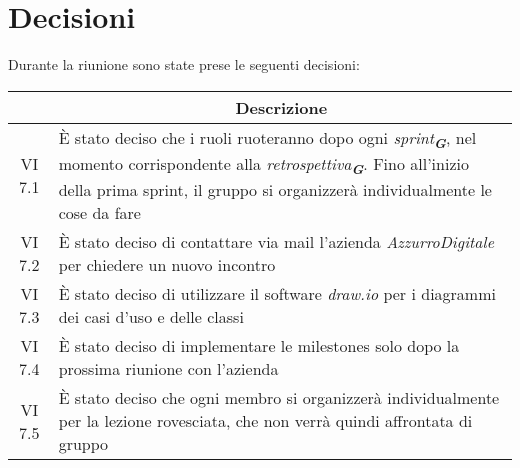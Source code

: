 

\section{Decisioni}

Durante la riunione sono state prese le seguenti decisioni:

\vspace{0.5cm}

\begin{table}[htbp]
    \centering
    \begin{tabular}{|c|p{}|}
        \hline
        \rowcolor[gray]{0.75}
        \multicolumn{1}{|c|}{\textbf{Codice}} & \multicolumn{1}{|c|}{\textbf{Descrizione}}\\
        \hline
        VI 7.1 & È stato deciso che i ruoli ruoteranno dopo ogni \emph{sprint}\textsubscript{\textit{\textbf{G}}}, nel momento corrispondente alla 
        \emph{retrospettiva}\textsubscript{\textit{\textbf{G}}}. Fino all'inizio della prima sprint, il gruppo si organizzerà individualmente le cose da fare \\
        \hline
        VI 7.2 & È stato deciso di contattare via mail l'azienda \emph{AzzurroDigitale} per chiedere un nuovo incontro \\
        \hline
        VI 7.3 & È stato deciso di utilizzare il software \emph{draw.io} per i diagrammi dei casi d'uso e delle classi \\
        \hline
        VI 7.4 & È stato deciso di implementare le milestones solo dopo la prossima riunione con l'azienda \\
        \hline
        VI 7.5 & È stato deciso che ogni membro si organizzerà individualmente per la lezione rovesciata, che non verrà quindi affrontata di gruppo \\
        \hline
    \end{tabular}
    \end{table}
